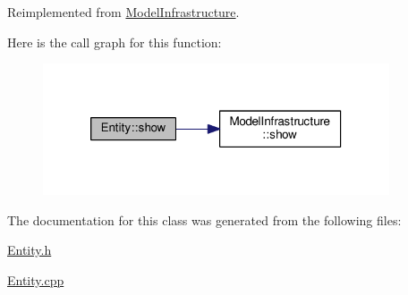 Reimplemented from \hyperlink{class_model_infrastructure_a649a5a89a0c9931783d3c51de2acf266}{Model\-Infrastructure}.



Here is the call graph for this function\-:
\nopagebreak
\begin{figure}[H]
\begin{center}
\leavevmode
\includegraphics[width=290pt]{class_entity_a86cc324050b451b31b134943e7978e36_cgraph}
\end{center}
\end{figure}




The documentation for this class was generated from the following files\-:\begin{DoxyCompactItemize}
\item 
\hyperlink{_entity_8h}{Entity.\-h}\item 
\hyperlink{_entity_8cpp}{Entity.\-cpp}\end{DoxyCompactItemize}
